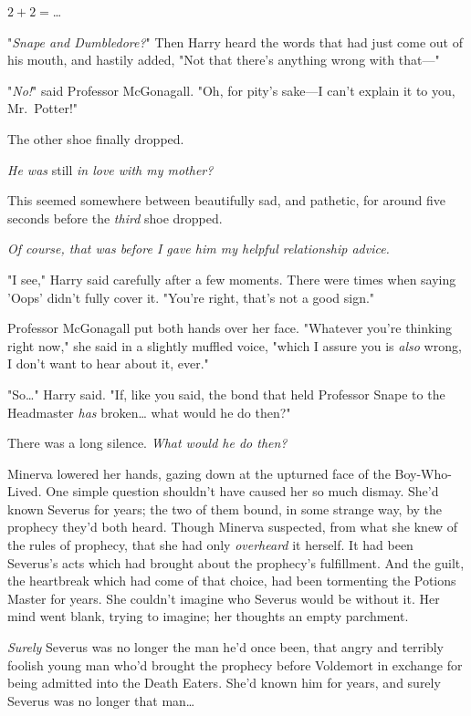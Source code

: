 $2 + 2 = ${\ldots}

"\emph{Snape and Dumbledore?}" Then Harry heard the words that had just come 
out of his mouth, and hastily added, "Not that there's anything wrong with 
that---"

"\emph{No!}" said Professor McGonagall. "Oh, for pity's sake---I can't explain 
it to you, Mr.~Potter!"

The other shoe finally dropped.

\emph{He was} still\emph{ in love with my mother?}

This seemed somewhere between beautifully sad, and pathetic, for around five 
seconds before the \emph{third} shoe dropped.

\emph{Of course, that was before I gave him my helpful relationship advice.}

"I see," Harry said carefully after a few moments. There were times when saying 
'Oops' didn't fully cover it. "You're right, that's not a good sign."

Professor McGonagall put both hands over her face. "Whatever you're thinking 
right now," she said in a slightly muffled voice, "which I assure you is 
\emph{also} wrong, I don't want to hear about it, ever."

"So{\ldots}" Harry said. "If, like you said, the bond that held Professor Snape 
to the Headmaster \emph{has} broken{\ldots} what would he do then?"

There was a long silence.
\sbreak
\emph{What would he do then?}

Minerva lowered her hands, gazing down at the upturned face of the 
Boy-Who-Lived. One simple question shouldn't have caused her so much dismay. 
She'd known Severus for years; the two of them bound, in some strange way, by 
the prophecy they'd both heard. Though Minerva suspected, from what she knew of 
the rules of prophecy, that she had only \emph{overheard} it herself. It had 
been Severus's acts which had brought about the prophecy's fulfillment. And the 
guilt, the heartbreak which had come of that choice, had been tormenting the 
Potions Master for years. She couldn't imagine who Severus would be without it. 
Her mind went blank, trying to imagine; her thoughts an empty parchment.

\emph{Surely} Severus was no longer the man he'd once been, that angry and 
terribly foolish young man who'd brought the prophecy before Voldemort in 
exchange for being admitted into the Death Eaters. She'd known him for years, 
and surely Severus was no longer that man{\ldots}

